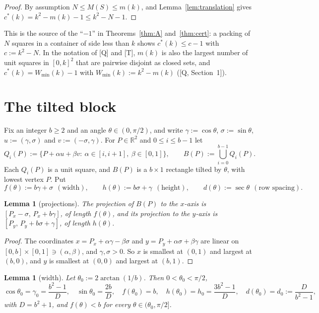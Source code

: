 \documentclass[11pt]{amsart}
\newcommand{\R}{\mathbb R}
\newcommand{\cs}{c^{*}}
\newcommand{\Wmin}{W_{\min}}
\newtheorem{lemma}[theorem]{Lemma}
\theoremstyle{definition}
\theoremstyle{remark}
\numberwithin{equation}{section}
\begin{document}
\begin{proof}
By assumption $N\le M(S)\le m(k)$, and Lemma~\ref{lem:translation} gives $\cs(k)=k^2-m(k)-1\le k^2-N-1$.
\end{proof}

This is the source of the ``$-1$'' in Theorems~\ref{thm:A} and~\ref{thm:cert}: a packing of $N$ squares in a container of
side less than $k$ shows $\cs(k)\le c-1$ with $c:=k^2-N$. In the notation of [Q] and [T], $m(k)$ is also the largest
number of unit squares in $[0,k]^2$ that are pairwise disjoint as closed sets, and $\cs(k)=\Wmin(k)-1$ with
$\Wmin(k):=k^2-m(k)$ ([Q, Section~1]).

\section{The tilted block}\label{sec:block}

Fix an integer $b\ge2$ and an angle $\theta\in(0,\pi/2)$, and write $\gamma:=\cos\theta$, $\sigma:=\sin\theta$,
$u:=(\gamma,\sigma)$ and $v:=(-\sigma,\gamma)$. For $P\in\R^2$ and $0\le i\le b-1$ let
\[
Q_i(P):=\{P+\alpha u+\beta v:\ \alpha\in[i,i+1],\ \beta\in[0,1]\},\qquad B(P):=\bigcup_{i=0}^{b-1}Q_i(P).
\]
Each $Q_i(P)$ is a unit square, and $B(P)$ is a $b\times1$ rectangle tilted by $\theta$, with lowest vertex $P$. Put
\[
f(\theta):=b\gamma+\sigma\ \ (\text{width}),\qquad h(\theta):=b\sigma+\gamma\ \ (\text{height}),\qquad
d(\theta):=\sec\theta\ \ (\text{row spacing}).
\]

\begin{lemma}[projections]\label{lem:proj}
The projection of $B(P)$ to the $x$-axis is $[P_x-\sigma,\,P_x+b\gamma]$, of length $f(\theta)$, and its projection to the
$y$-axis is $[P_y,\,P_y+b\sigma+\gamma]$, of length $h(\theta)$.
\end{lemma}

\begin{proof}
The coordinates $x=P_x+\alpha\gamma-\beta\sigma$ and $y=P_y+\alpha\sigma+\beta\gamma$ are linear on
$[0,b]\times[0,1]\ni(\alpha,\beta)$, and $\gamma,\sigma>0$. So $x$ is smallest at $(0,1)$ and largest at $(b,0)$, and $y$
is smallest at $(0,0)$ and largest at $(b,1)$.
\end{proof}

\begin{lemma}[width]\label{lem:width}
Let $\theta_0:=2\arctan(1/b)$. Then $0<\theta_0<\pi/2$,
\[
\cos\theta_0=\gamma_0=\frac{b^2-1}{D},\quad \sin\theta_0=\frac{2b}{D},\quad f(\theta_0)=b,\quad
h(\theta_0)=h_0=\frac{3b^2-1}{D},\quad d(\theta_0)=d_0:=\frac{D}{b^2-1},
\]
with $D=b^2+1$, and $f(\theta)<b$ for every $\theta\in(\theta_0,\pi/2]$.
\end{lemma}
\end{document}
